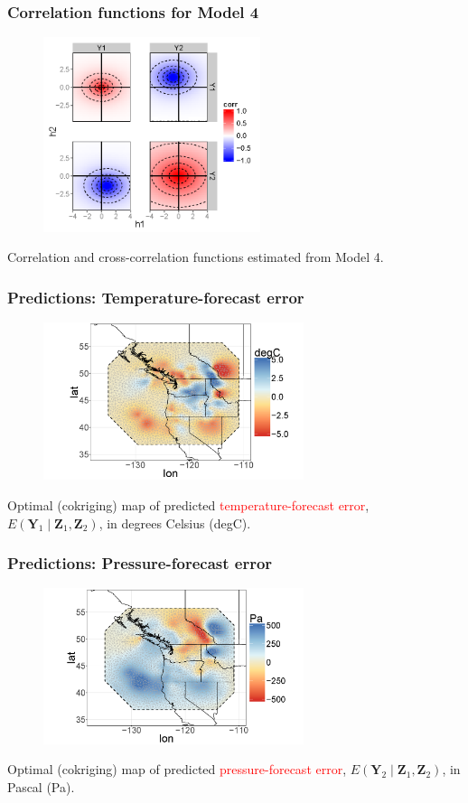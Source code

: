 \documentclass{beamer}
\newcommand{\Yvec}{\mathbf{Y}}
\newcommand{\Zvec}{\mathbf{Z}}
\newcommand{\E}{E}
\begin{document}
\begin{frame}
\frametitle{Correlation functions for Model 4}
\vspace{-0.2in}
\begin{figure}
\includegraphics[width=2.5in]{Fig_cross_fns.png}
\end{figure}
\vspace{-.5cm}
\small{Correlation and cross-correlation functions estimated from Model 4.}
\end{frame}



\begin{frame}
\frametitle{Predictions: Temperature-forecast error}

\begin{figure}
\includegraphics[width=3in]{Fig3b1.png}
\end{figure}
\vspace{-.5cm}
Optimal (cokriging) map of predicted \textcolor{red}{temperature-forecast error}, $\E(\Yvec_1 \mid  \Zvec_1,\Zvec_2)$, in degrees Celsius (degC).
\end{frame}


\begin{frame}
\frametitle{Predictions: Pressure-forecast error}
\begin{figure}
\includegraphics[width=3in]{Fig3b2.png}
\end{figure}
\vspace{-.5cm}
Optimal (cokriging) map of predicted \textcolor{red}{pressure-forecast error}, $\E(\Yvec_2 \mid  \Zvec_1,\Zvec_2)$, in Pascal (Pa).
\end{frame}
\end{document}
